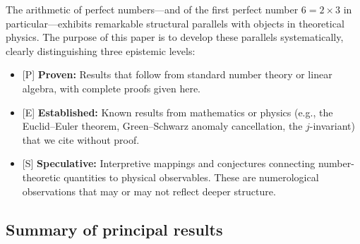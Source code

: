 \documentclass[11pt,letterpaper]{article}
\theoremstyle{definition}
\theoremstyle{remark}
\newcommand{\proven}{\textsf{[P]}}
\newcommand{\established}{\textsf{[E]}}
\newcommand{\speculative}{\textsf{[S]}}
\begin{document}
The arithmetic of perfect numbers---and of the first perfect number $6 = 2 \times 3$ in 
particular---exhibits remarkable structural parallels with objects in theoretical physics.  
The purpose of this paper is to develop these parallels systematically, 
clearly distinguishing three epistemic levels:

\begin{itemize}[leftmargin=2em]
\item \proven{} \textbf{Proven:} Results that follow from standard number theory 
      or linear algebra, with complete proofs given here.
\item \established{} \textbf{Established:} Known results from mathematics 
      or physics (e.g., the Euclid--Euler theorem, Green--Schwarz anomaly 
      cancellation, the $j$-invariant) that we cite without proof.
\item \speculative{} \textbf{Speculative:} Interpretive mappings and 
      conjectures connecting number-theoretic quantities to physical 
      observables. These are numerological observations that may or may 
      not reflect deeper structure.
\end{itemize}

\subsection{Summary of principal results}
\end{document}
